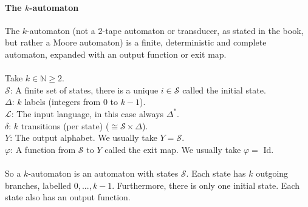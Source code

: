 \documentclass{article}
\begin{document}
\paragraph{The $k$-automaton}
The $k$-automaton (not a 2-tape automaton or transducer, as stated in the
book, but rather a Moore automaton) is a finite, deterministic and complete
automaton, expanded with an output function or exit map.\\
\\
Take $k \in \mathbb{N} \ge 2$.\\
$\mathcal{S}$: A finite set of states, there is a unique $i \in \mathcal{S}$
called the initial state.\\
$\Delta$: $k$ labels (integers from 0 to $k - 1$).\\
$\mathcal{L}$: The input language, in this case always $\Delta^*$.\\
$\delta$: $k$ transitions (per state) ($\cong \mathcal{S} \times \Delta$).\\
$Y$: The output alphabet. We usually take $Y = \mathcal{S}$.\\
$\varphi$: A function from $\mathcal{S}$ to $Y$ called the exit map. We
           usually take $\varphi =$ Id.\\
\\
So a $k$-automaton is an automaton with states $\mathcal{S}$. Each state has
$k$ outgoing branches, labelled $0, ..., k - 1$. Furthermore, there is only
one initial state. Each state also has an output function.
\end{document}
